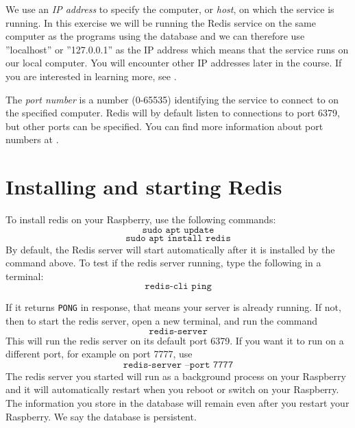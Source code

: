 \documentclass{article}
\begin{document}
We use an \emph{IP address} to specify the computer, or \emph{host}, on which the service is running. In this exercise we will be running the Redis service on the same computer as the programs using the database and we can therefore use ''localhost'' or ''127.0.0.1'' as the IP address which means that the service runs on our local computer. You will encounter other IP addresses later in the course. If you are interested in learning more, see \cite{ipaddress}.

The \emph{port number} is a number (0-65535) identifying the service to connect to on the specified computer. Redis will by default listen to connections to port 6379, but other ports can be specified. You can find more information about port numbers at \cite{portnumber}.

\newpage

\section{Installing  and starting Redis}
To install redis on your Raspberry, use the following commands:
\begin{equation}
    \texttt{sudo apt update}
\end{equation}
\begin{equation}
    \texttt{sudo apt install redis} 
\end{equation}
By default, the Redis server will start automatically after it is installed by the command above. 
 To test if the redis server running, type the following in a terminal:
\begin{equation}
    \texttt{redis-cli ping}
\end{equation}

If it returns \texttt{PONG} in response, that means your server is already running. If not, then to start the redis server, open a new terminal, and run the command
\begin{equation}
    \texttt{redis-server}
\end{equation}
This will run the redis server on its default port 6379. If you want it to run on a different port, for example on port 7777, use
\begin{equation}
    \texttt{redis-server --port 7777}
\end{equation}
The redis server you started will run as a background process on your Raspberry and it will automatically restart when you reboot or switch on your Raspberry. The information you store in the database will remain even after you restart your Raspberry. We say the database is persistent.
\end{document}
